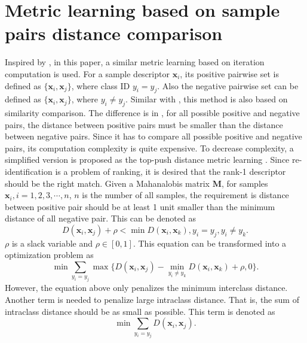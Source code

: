  \section{Metric learning based on sample pairs distance comparison}
 Inspired by \cite{TDL}, in this paper, a similar metric learning based on iteration computation is used. For a  sample descriptor $\bm{x}_i$,  its positive pairwise set is defined as $\{\bm{x}_i,\bm{x}_j\}$, where class ID $y_i = y_j$. Also the negative pairwise set can be defined as $\{\bm{x}_i,\bm{x}_j\}$, where $y_i \ne y_j$. Similar with \cite{PRDC}, this method is also based on similarity comparison. The difference is in \cite{PRDC}, for all possible positive and negative pairs, the distance between positive pairs must be smaller than the distance between negative pairs. Since it has to compare all possible positive and negative pairs, its computation complexity is quite expensive. To decrease complexity, a simplified version is proposed as the top-push distance metric learning \cite{TDL}.  Since re-identification is a problem of ranking, it is desired that the rank-1 descriptor should be the right match. Given a Mahanalobis matrix $\bm{M}$, for samples $\bm{x}_i, i = 1,2,3,\cdots,n$, $n$ is the number of all samples, the requirement is distance between positive pair should be at least 1 unit smaller than the minimum distance of all negative pair. This can be denoted as 
 \begin{equation}
 D(\bm{x}_i,\bm{x}_j) + \rho < \min D(\bm{x}_i,\bm{x}_k), y_i = y_j, y_i\ne y_k.
 \end{equation}
 $\rho$ is a slack variable and $\rho \in [0,1]$. This equation can be transformed into a optimization problem as
 \begin{equation}
 \label{term1}
 \min \sum_{y_i = y_j} \max \{D(\bm{x}_i,\bm{x}_j) -  \min_{ y_i\ne y_k} D(\bm{x}_i,\bm{x}_k)  + \rho , 0\}.
 \end{equation}
However, the equation above only penalizes the minimum interclass distance. Another term is needed to penalize large intraclass distance. That is, the sum of intraclass distance should be as small as possible. This term is denoted as 
 \begin{equation} \label{term2}
 \min \sum_{y_i = y_j} D(\bm{x}_i,\bm{x}_j).
 \end{equation}

